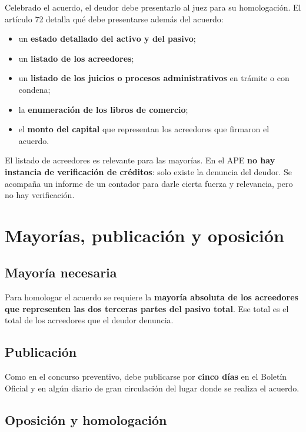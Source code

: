 \documentclass[12pt,oneside]{book}
\begin{document}
Celebrado el acuerdo, el deudor debe presentarlo al juez para su homologación. El artículo 72 detalla qué debe presentarse además del acuerdo:

\begin{itemize}
    \item un \textbf{estado detallado del activo y del pasivo};
    \item un \textbf{listado de los acreedores};
    \item un \textbf{listado de los juicios o procesos administrativos} en trámite o con condena;
    \item la \textbf{enumeración de los libros de comercio};
    \item el \textbf{monto del capital} que representan los acreedores que firmaron el acuerdo.
\end{itemize}

\begin{important}
El listado de acreedores es relevante para las mayorías. En el APE \textbf{no hay instancia de verificación de créditos}: solo existe la denuncia del deudor. Se acompaña un informe de un contador para darle cierta fuerza y relevancia, pero no hay verificación.
\end{important}

\section{Mayorías, publicación y oposición}

\subsection{Mayoría necesaria}

Para homologar el acuerdo se requiere la \textbf{mayoría absoluta de los acreedores que representen las dos terceras partes del pasivo total}. Ese total es el total de los acreedores que el deudor denuncia.

\subsection{Publicación}

Como en el concurso preventivo, debe publicarse por \textbf{cinco días} en el Boletín Oficial y en algún diario de gran circulación del lugar donde se realiza el acuerdo.

\subsection{Oposición y homologación}
\end{document}

